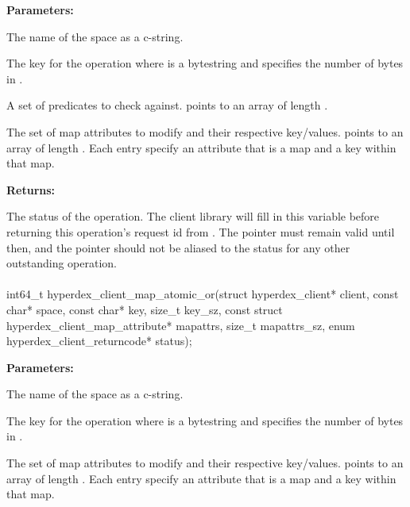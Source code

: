 \noindent\textbf{Parameters:}
\begin{description}[labelindent=\widthof{{\code{mapattrs}, \code{mapattrs\_sz}}},leftmargin=*,noitemsep,nolistsep,align=right]
\item[\code{space}] The name of the space as a c-string.
\item[\code{key}, \code{key\_sz}] The key for the operation where  is a bytestring and  specifies the number of bytes in .
\item[\code{checks}, \code{checks\_sz}] A set of predicates to check against.   points to an array of length .
\item[\code{mapattrs}, \code{mapattrs\_sz}] The set of map attributes to modify and their respective key/values.   points to an array of length .  Each entry specify an attribute that is a map and a key within that map.
\end{description}

\noindent\textbf{Returns:}
\begin{description}[labelindent=\widthof{{\code{status}}},leftmargin=*,noitemsep,nolistsep,align=right]
\item[\code{status}] The status of the operation.  The client library will fill in this variable before returning this operation's request id from .  The pointer must remain valid until then, and the pointer should not be aliased to the status for any other outstanding operation.
\end{description}

\paragraph{}
\begin{ccode}
int64_t hyperdex_client_map_atomic_or(struct hyperdex_client* client,
                const char* space,
                const char* key, size_t key_sz,
                const struct hyperdex_client_map_attribute* mapattrs, size_t mapattrs_sz,
                enum hyperdex_client_returncode* status);
\end{ccode}
\funcdesc 

\noindent\textbf{Parameters:}
\begin{description}[labelindent=\widthof{{\code{mapattrs}, \code{mapattrs\_sz}}},leftmargin=*,noitemsep,nolistsep,align=right]
\item[\code{space}] The name of the space as a c-string.
\item[\code{key}, \code{key\_sz}] The key for the operation where  is a bytestring and  specifies the number of bytes in .
\item[\code{mapattrs}, \code{mapattrs\_sz}] The set of map attributes to modify and their respective key/values.   points to an array of length .  Each entry specify an attribute that is a map and a key within that map.
\end{description}

